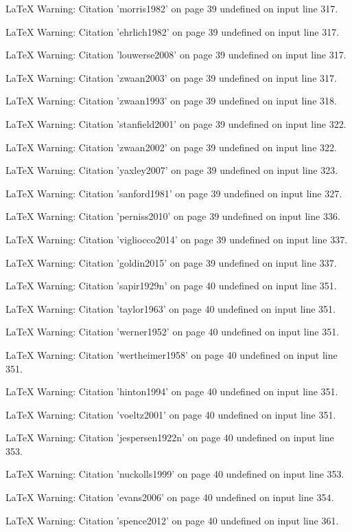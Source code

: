 LaTeX Warning: Citation 'morris1982' on page 39 undefined on input line 317.


LaTeX Warning: Citation 'ehrlich1982' on page 39 undefined on input line 317.


LaTeX Warning: Citation 'louwerse2008' on page 39 undefined on input line 317.


LaTeX Warning: Citation 'zwaan2003' on page 39 undefined on input line 317.


LaTeX Warning: Citation 'zwaan1993' on page 39 undefined on input line 318.


LaTeX Warning: Citation 'stanfield2001' on page 39 undefined on input line 322.


LaTeX Warning: Citation 'zwaan2002' on page 39 undefined on input line 322.


LaTeX Warning: Citation 'yaxley2007' on page 39 undefined on input line 323.


LaTeX Warning: Citation 'sanford1981' on page 39 undefined on input line 327.


LaTeX Warning: Citation 'perniss2010' on page 39 undefined on input line 336.


LaTeX Warning: Citation 'vigliocco2014' on page 39 undefined on input line 337.


LaTeX Warning: Citation 'goldin2015' on page 39 undefined on input line 337.


LaTeX Warning: Citation 'sapir1929n' on page 40 undefined on input line 351.


LaTeX Warning: Citation 'taylor1963' on page 40 undefined on input line 351.


LaTeX Warning: Citation 'werner1952' on page 40 undefined on input line 351.


LaTeX Warning: Citation 'wertheimer1958' on page 40 undefined on input line 351.


LaTeX Warning: Citation 'hinton1994' on page 40 undefined on input line 351.


LaTeX Warning: Citation 'voeltz2001' on page 40 undefined on input line 351.


LaTeX Warning: Citation 'jespersen1922n' on page 40 undefined on input line 353.


LaTeX Warning: Citation 'nuckolls1999' on page 40 undefined on input line 353.


LaTeX Warning: Citation 'evans2006' on page 40 undefined on input line 354.


LaTeX Warning: Citation 'spence2012' on page 40 undefined on input line 361.


